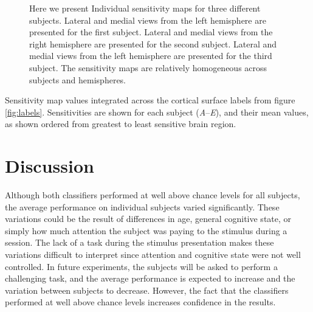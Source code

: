 \documentclass[preprint,5p,authoryear]{elsarticle}
\begin{document}
\begin{figure}[p]
\begin{subfigure}{0.3\textwidth}
\caption{}
\label{fig:s3-lh-medial-sensitivity}
\end{subfigure}
\caption{Here we present Individual sensitivity maps for three different subjects. 
Lateral  and medial  views from the left hemisphere are presented for the first subject.
Lateral  and medial  views from the right hemisphere are presented for the second subject.
Lateral  and medial  views from the left hemisphere are presented for the third subject.
The sensitivity maps are relatively homogeneous across subjects and hemispheres.}
\label{fig:individual-sensitivity}
\end{figure}

\begin{table}[p]
\centering

\caption{Sensitivity map values integrated across the cortical surface labels from figure \ref{fig:labels}. Sensitivities are shown for each subject (\emph{A}--\emph{E}), and their mean values, as shown ordered from greatest to least sensitive brain region.}
\label{tab:full-sensitivity}
\end{table}

\section{Discussion}
Although both classifiers performed at well above chance levels for all subjects, the average performance on individual subjects varied significantly.
These variations could be the result of differences in age, general cognitive state, or simply how much attention the subject was paying to the stimulus during a session.
The lack of a task during the stimulus presentation makes these variations difficult to interpret since attention and cognitive state were not well controlled.
In future experiments, the subjects will be asked to perform a challenging task, and the average performance is expected to increase and the variation between subjects to decrease.
However, the fact that the classifiers performed at well above chance levels increases confidence in the results.
\end{document}
